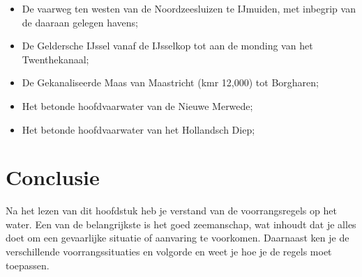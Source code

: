 \begin{itemize}
	\item De vaarweg ten westen van de Noordzeesluizen te IJmuiden, met inbegrip van de daaraan gelegen havens;
	\item De Geldersche IJssel vanaf de IJsselkop tot aan de monding van het Twenthekanaal;
	\item De Gekanaliseerde Maas van Maastricht (kmr 12,000) tot Borgharen;
	\item Het betonde hoofdvaarwater van de Nieuwe Merwede;
	\item Het betonde hoofdvaarwater van het Hollandsch Diep;
\end{itemize}

\section{Conclusie}
Na het lezen van dit hoofdstuk heb je verstand van de voorrangsregels op het water. Een van de belangrijkste is het goed zeemanschap, wat inhoudt dat je alles doet om een gevaarlijke situatie of aanvaring te voorkomen. Daarnaast ken je de verschillende voorrangssituaties en volgorde en weet je hoe je de regels moet toepassen. 
